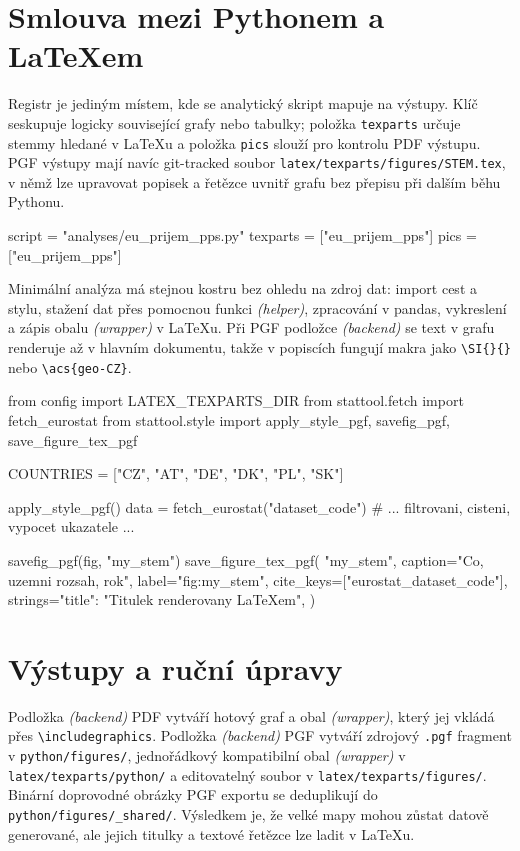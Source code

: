 \documentclass[
  a4paper, 10pt,
  master,
  final,
  notitlepage,
  noheader,
  nofrontmatter,
  noacro,
  nobibliography,
  nosoftware,
  nobackmatter,
  CTUend
]{CTUthesis}
\begin{document}
\section*{Smlouva mezi Pythonem a LaTeXem}
Registr je jediným místem, kde se analytický skript mapuje na výstupy. Klíč
seskupuje logicky související grafy nebo tabulky; položka \texttt{texparts}
určuje stemmy hledané v \LaTeX{}u a položka \texttt{pics} slouží pro kontrolu
PDF výstupu. PGF výstupy mají navíc git-tracked soubor
\texttt{latex/texparts/figures/STEM.tex}, v němž lze upravovat popisek a
řetězce uvnitř grafu bez přepisu při dalším běhu Pythonu.

\begin{pipelinecode}
script   = "analyses/eu_prijem_pps.py"
texparts = ["eu_prijem_pps"]
pics     = ["eu_prijem_pps"]
\end{pipelinecode}

Minimální analýza má stejnou kostru bez ohledu na zdroj dat: import cest a
stylu, stažení dat přes pomocnou funkci \textit{(helper)}, zpracování v pandas,
vykreslení a zápis obalu \textit{(wrapper)} v \LaTeX{}u. Při PGF podložce
\textit{(backend)} se text v grafu renderuje až v hlavním dokumentu, takže
v popiscích fungují makra jako \texttt{\textbackslash SI\{\}\{\}}
nebo \texttt{\textbackslash acs\{geo-CZ\}}.

\begin{pipelinecode}
from config import LATEX_TEXPARTS_DIR
from stattool.fetch import fetch_eurostat
from stattool.style import apply_style_pgf, savefig_pgf, save_figure_tex_pgf

COUNTRIES = ["CZ", "AT", "DE", "DK", "PL", "SK"]

apply_style_pgf()
data = fetch_eurostat("dataset_code")
# ... filtrovani, cisteni, vypocet ukazatele ...

savefig_pgf(fig, "my_stem")
save_figure_tex_pgf(
    "my_stem",
    caption="Co, uzemni rozsah, rok",
    label="fig:my_stem",
    cite_keys=["eurostat_dataset_code"],
    strings={"title": "Titulek renderovany LaTeXem"},
)
\end{pipelinecode}

\section*{Výstupy a ruční úpravy}
Podložka \textit{(backend)} PDF vytváří hotový graf a obal \textit{(wrapper)},
který jej vkládá přes \texttt{\textbackslash includegraphics}. Podložka
\textit{(backend)} PGF vytváří zdrojový \texttt{.pgf} fragment
v \texttt{python/figures/}, jednořádkový kompatibilní obal \textit{(wrapper)}
v \texttt{latex/texparts/python/} a editovatelný soubor
v \texttt{latex/texparts/figures/}. Binární doprovodné obrázky PGF exportu se
deduplikují do \texttt{python/figures/\_shared/}. Výsledkem je, že velké
mapy mohou zůstat datově generované, ale jejich titulky a textové řetězce lze
ladit v \LaTeX{}u.
\end{document}
